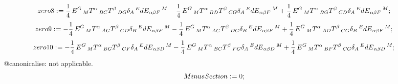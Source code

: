 \documentclass[11pt]{article}
\def\specialcolon{\mathrel{\mathop{:}}\hspace{-.5em}}
\begin{document}
\begin{dmath*}[compact, spread=2pt]
zero8\specialcolon{}= \frac{1}{4}\, {E}^{G}\,_{M} {T}^{\alpha}\,_{B C} {T}^{\beta}\,_{D G} {\delta}_{A}\,^{E} {dE}_{\alpha \beta F}\,^{M} - \frac{1}{4}\, {E}^{G}\,_{M} {T}^{\alpha}\,_{B D} {T}^{\beta}\,_{C G} {\delta}_{A}\,^{E} {dE}_{\alpha \beta F}\,^{M} + \frac{1}{4}\, {E}^{G}\,_{M} {T}^{\alpha}\,_{B G} {T}^{\beta}\,_{C D} {\delta}_{A}\,^{E} {dE}_{\alpha \beta F}\,^{M};
\end{dmath*}
\begin{dmath*}[compact, spread=2pt]
zero9\specialcolon{}=  - \frac{1}{4}\, {E}^{G}\,_{M} {T}^{\alpha}\,_{A G} {T}^{\beta}\,_{C D} {\delta}_{B}\,^{E} {dE}_{\alpha \beta F}\,^{M} - \frac{1}{4}\, {E}^{G}\,_{M} {T}^{\alpha}\,_{A C} {T}^{\beta}\,_{D G} {\delta}_{B}\,^{E} {dE}_{\alpha \beta F}\,^{M} + \frac{1}{4}\, {E}^{G}\,_{M} {T}^{\alpha}\,_{A D} {T}^{\beta}\,_{C G} {\delta}_{B}\,^{E} {dE}_{\alpha \beta F}\,^{M};
\end{dmath*}
\begin{dmath*}[compact, spread=2pt]
zero10\specialcolon{}=  - \frac{1}{4}\, {E}^{G}\,_{M} {T}^{\alpha}\,_{B G} {T}^{\beta}\,_{C F} {\delta}_{A}\,^{E} {dE}_{\alpha \beta D}\,^{M} - \frac{1}{4}\, {E}^{G}\,_{M} {T}^{\alpha}\,_{B C} {T}^{\beta}\,_{F G} {\delta}_{A}\,^{E} {dE}_{\alpha \beta D}\,^{M} + \frac{1}{4}\, {E}^{G}\,_{M} {T}^{\alpha}\,_{B F} {T}^{\beta}\,_{C G} {\delta}_{A}\,^{E} {dE}_{\alpha \beta D}\,^{M};
\end{dmath*}
@canonicalise: not applicable.
\begin{dmath*}[compact, spread=2pt]
MinusSection\specialcolon{}= 0;
\end{dmath*}
\end{document}
